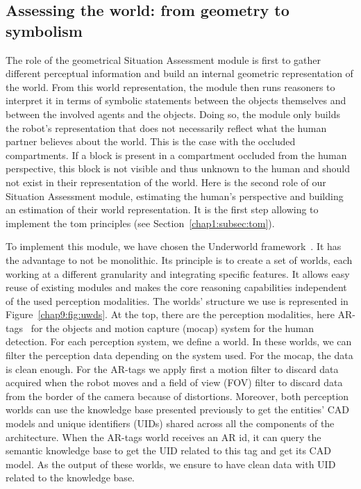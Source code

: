 \documentclass[a4paper,11pt,twoside]{StyleThese}
\begin{document}
\subsection{Assessing the world: from geometry to symbolism}

The role of the geometrical Situation Assessment module is first to gather different perceptual information and build an internal geometric representation of the world. From this world representation, the module then runs reasoners to interpret it in terms of symbolic statements between the objects themselves and between the involved agents and the objects. Doing so, the module only builds the robot's representation that does not necessarily reflect what the human partner believes about the world. This is the case with the occluded compartments. If a block is present in a compartment occluded from the human perspective, this block is not visible and thus unknown to the human and should not exist in their representation of the world. Here is the second role of our Situation Assessment module, estimating the human's perspective and building an estimation of their world representation. It is the first step allowing to implement the \acrshort{tom} principles (see Section~\ref{chap1:subsec:tom}).

To implement this module, we have chosen the Underworld framework~\cite{lemaignan_2018_underworlds}. It has the advantage to not be monolithic. Its principle is to create a set of worlds, each working at a different granularity and integrating specific features. It allows easy reuse of existing modules and makes the core reasoning capabilities independent of the used perception modalities. The worlds' structure we use is represented in Figure~\ref{chap9:fig:uwds}. At the top, there are the perception modalities, here AR-tags~\cite{fiala_2005_artag} for the objects and motion capture (mocap) system for the human detection. For each perception system, we define a world. In these worlds, we can filter the perception data depending on the system used. For the mocap, the data is clean enough. For the AR-tags we apply first a motion filter to discard data acquired when the robot moves and a field of view (FOV) filter to discard data from the border of the camera because of distortions. Moreover, both perception worlds can use the knowledge base presented previously to get the entities' CAD models and unique identifiers (UIDs) shared across all the components of the architecture. When the AR-tags world receives an AR id, it can query the semantic knowledge base to get the UID related to this tag and get its CAD model. As the output of these worlds, we ensure to have clean data with UID related to the knowledge base.
\end{document}
